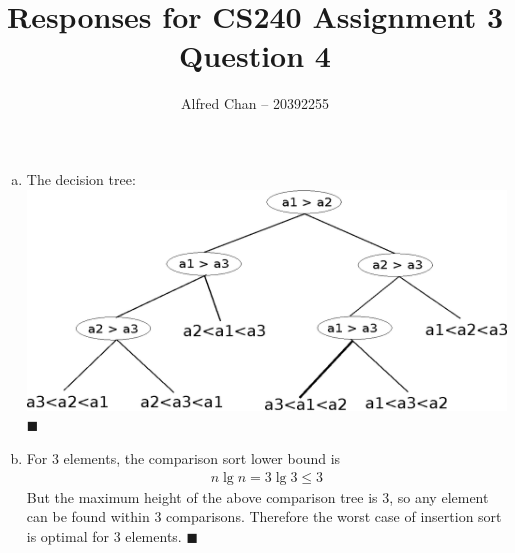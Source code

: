 \documentclass[12pt]{article}
\title{Responses for CS240 Assignment 3 Question 4}
\author{Alfred Chan -- 20392255}
\begin{document}
\maketitle
\begin{enumerate}[(a)]
\item
The decision tree:\\
\includegraphics[scale=0.8]{decision_tree.eps}
\hfill $\blacksquare$
\item
For 3 elements, the comparison sort lower bound is
\begin{align*}
n \lg n = 3 \lg 3 \le 3
\end{align*}
But the maximum height of the above comparison tree is 3, so any element can be found within 3 comparisons. Therefore the worst case of insertion sort is optimal for 3 elements.
\hfill $\blacksquare$
\end{enumerate}
\end{document}
